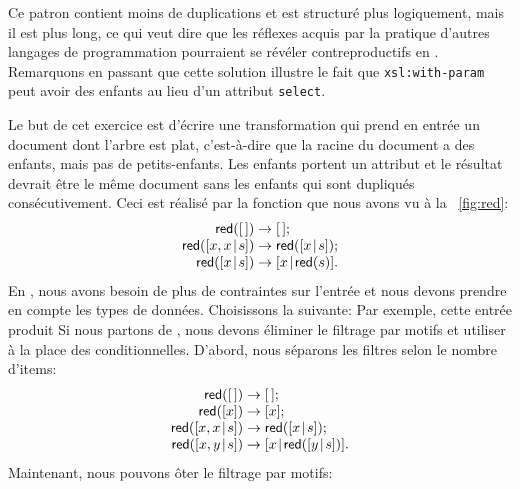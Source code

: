 Ce patron contient moins de duplications et est structuré plus
logiquement, mais il est plus long, ce qui veut dire que les réflexes
acquis par la pratique d'autres langages de programmation pourraient
se révéler contreproductifs en \XSLT. Remarquons en passant que cette
solution illustre le fait que \texttt{xsl:with-param} peut avoir des
enfants au lieu d'un attribut \texttt{select}.


Le but de cet exercice est d'écrire une transformation \XSLT qui prend
en entrée un document dont l'arbre est plat, c'est-à-dire que la
racine du document a des enfants, mais pas de petits-enfants. Les
enfants portent un attribut et le résultat devrait être le même
document sans les enfants qui sont dupliqués consécutivement. Ceci est
réalisé par la fonction  que nous avons vu à la
\fig~\vref{fig:red}:
\begin{equation*}
\begin{array}{@{}r@{\;}c@{\;}l@{}}
\fun{red}(\el) & \rightarrow & \el;\\
\fun{red}(\cons{x,x}{s}) & \rightarrow & \fun{red}(\cons{x}{s});\\
\fun{red}(\cons{x}{s})   & \rightarrow & \cons{x}{\fun{red}(s)}.
\end{array}
\end{equation*}
En \XSLT, nous avons besoin de plus de contraintes sur l'entrée et
nous devons prendre en compte les types de données. Choisissons la \DTD suivante:
\noindent Par exemple, cette entrée
\noindent produit
\noindent Si nous partons de , nous devons éliminer le
filtrage par motifs et utiliser à la place des
conditionnelles. D'abord, nous séparons les filtres selon le nombre
d'items:
\begin{equation*}
\begin{array}{@{}r@{\;}c@{\;}l@{}}
\fun{red}(\el) & \rightarrow & \el;\\
\fun{red}([x]) & \rightarrow & [x];\\
\fun{red}(\cons{x,x}{s}) & \rightarrow & \fun{red}(\cons{x}{s});\\
\fun{red}(\cons{x,y}{s}) & \rightarrow & \cons{x}{\fun{red}(\cons{y}{s})}.
\end{array}
\end{equation*}
Maintenant, nous pouvons ôter le filtrage par motifs:
